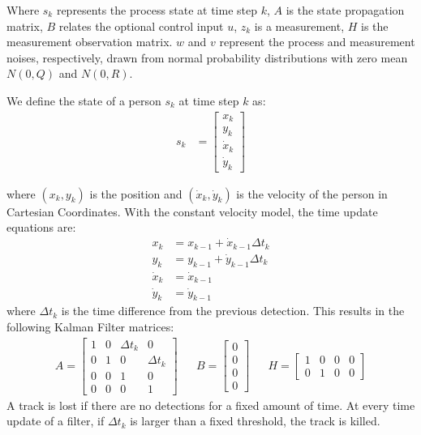 Where $s_k$ represents the process state at time step $k$, $A$ is the state propagation matrix, $B$ relates the optional control input $u$, $z_k$ is a measurement, $H$ is the measurement observation matrix. $w$ and $v$ represent the process and measurement noises, respectively, drawn from normal probability distributions with zero mean $N(0,Q)$ and $N(0,R)$.

We define the state of a person $s_k$ at time step $k$ as:
\begin{align}
s_k & =
\begin{bmatrix} 
 x_k \\ 
 y_k\\
 \dot{x}_{k} \\
 \dot{y}_{k}
\end{bmatrix}
\end{align}

where $(x_k,y_k)$ is the position and $(\dot{x}_{k}, \dot{y}_{k})$ is the velocity of the person in Cartesian Coordinates. With the constant velocity model, the time update equations are:
\begin{align}
x_k&=x_{k-1}+\dot{x}_{k-1} \Delta t_k\\
y_k&=y_{k-1}+\dot{y}_{k-1} \Delta t_k\\
\dot{x}_{k}&=\dot{x}_{k-1} \\
\dot{y}_{k}&=\dot{y}_{k-1}
\end{align}
where $\Delta t_k$ is the time difference from the previous detection. This results in the following Kalman Filter matrices:
\begin{align}
A =
\begin{bmatrix} 
 1 & 0 &\Delta t_k & 0\\
 0 & 1 & 0 & \Delta t_k\\
 0 & 0 & 1 & 0\\
 0 & 0 & 0 & 1
\end{bmatrix} &&
B =
\begin{bmatrix} 
 0 \\
 0 \\
 0 \\
 0
\end{bmatrix} &&
H =
\begin{bmatrix} 
1 & 0 & 0 & 0 \\
 0 & 1 & 0 & 0
\end{bmatrix} 
\end{align}
A track is lost if there are no detections for a fixed amount of time. At every time update of a filter, if $\Delta t_k$ is larger than a fixed threshold, the track is killed.

